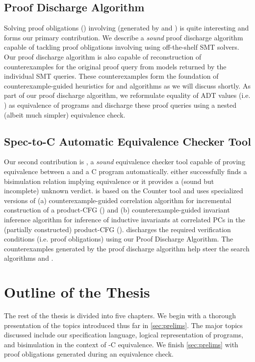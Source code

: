 \subsection*{Proof Discharge Algorithm}
\vspace{-6px}
Solving proof obligations () involving \recursiveRelations{}
(generated by  and ) is quite interesting and forms our primary contribution.
We describe a {\em sound} proof discharge algorithm capable of tackling proof obligations involving
\recursiveRelations{} using off-the-shelf SMT solvers. Our proof discharge algorithm is also capable of
reconstruction of counterexamples for the original proof query from models returned by the individual SMT queries.
These counterexamples form the foundation of counterexample-guided heuristics for  and  algorithms
as we will discuss shortly.
As part of our proof discharge algorithm,
we reformulate equality of ADT values (i.e. \recursiveRelations{}) as equivalence of programs
and discharge these proof queries using a nested (albeit much simpler) equivalence check.

\subsection*{Spec-to-C Automatic Equivalence Checker Tool}
\vspace{-6px}
Our second contribution is \toolName{}, a {\em sound} equivalence checker tool
capable of proving equivalence between a \SpecL{} and a C program automatically.
\toolName{} either successfully finds a bisimulation relation implying equivalence or it provides a (sound but incomplete) unknown verdict.
\toolName{} is based on the Counter tool\cite{oopsla20} and uses specialized versions of (a) counterexample-guided correlation algorithm for
incremental construction of a product-CFG () and (b) counterexample-guided invariant inference algorithm
for inference of inductive invariants at correlated PCs in the (partially constructed) product-CFG ().
\toolName{} discharges the required verification conditions (i.e. proof obligations) using our Proof Discharge Algorithm.
The counterexamples generated by the proof discharge algorithm help steer the search algorithms  and .

\vspace{-6px}
\section{Outline of the Thesis}
\label{sec:outline}
\vspace{-6px}
The rest of the thesis is divided into five chapters.
We begin with a thorough presentation of the topics introduced thus far in \cref{sec:prelims}.
The major topics discussed include our specification language, logical representation of programs, and bisimulation
in the context of \SpecL{}-C equivalence.
We finish \cref{sec:prelims} with proof obligations generated during an equivalence check.

